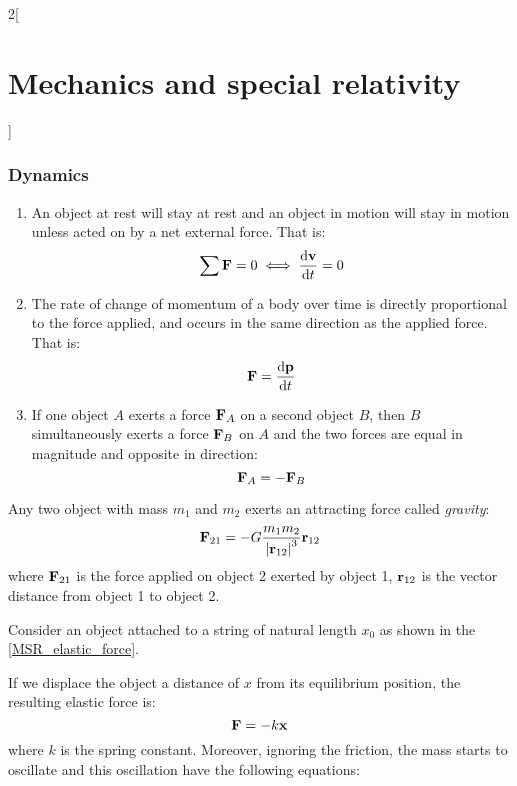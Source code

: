 \documentclass[../../../main.tex]{subfiles}
\begin{document}
\begin{multicols}{2}[\section{Mechanics and special relativity}]
  \subsubsection{Dynamics}
  \begin{law}
    \hfill
    \begin{enumerate}
      \item An object at rest will stay at rest and an object in motion will stay in motion unless acted on by a net external force. That is: $$\sum\boldsymbol{\mathrm{F}}=0\iff\dv{\boldsymbol{\mathrm{v}}}{t}=0$$
      \item The rate of change of momentum of a body over time is directly proportional to the force applied, and occurs in the same direction as the applied force. That is: $$\boldsymbol{\mathrm{F}}=\dv{\boldsymbol{\mathrm{p}}}{t}$$
      \item If one object $A$ exerts a force $\boldsymbol{\mathrm{F}}_A$ on a second object $B$, then $B$ simultaneously exerts a force $\boldsymbol{\mathrm{F}}_B$ on $A$ and the two forces are equal in magnitude and opposite in direction: $$\boldsymbol{\mathrm{F}}_A=-\boldsymbol{\mathrm{F}}_B$$
    \end{enumerate}
  \end{law}
  \begin{prop}
    Any two object with mass $m_1$ and $m_2$ exerts an attracting force called \textit{gravity}:
    $$\boldsymbol{\mathrm{F}}_{21}=-G\frac{m_1m_2}{{|\boldsymbol{\mathrm{r}}_{12}|}^3}\boldsymbol{\mathrm{r}}_{12}$$
    where $\boldsymbol{\mathrm{F}}_{21}$ is the force applied on object 2 exerted by object 1, $\boldsymbol{\mathrm{r}}_{12}$ is the vector distance from object 1 to object 2.
  \end{prop}
  \begin{prop}
    Consider an object attached to a string of natural length $x_0$ as shown in the \cref{MSR_elastic_force}.
    \begin{center}
      \begin{minipage}{\linewidth}
        \centering
        
        \label{MSR_elastic_force}
      \end{minipage}
    \end{center}
    If we displace the object a distance of $x$ from its equilibrium position, the resulting elastic force is: $$\boldsymbol{\mathrm{F}}=-k\boldsymbol{\mathrm{x}}$$ where $k$ is the spring constant. Moreover, ignoring the friction, the mass starts to oscillate and this oscillation have the following equations:

\end{prop}
\end{multicols}
\end{document}
